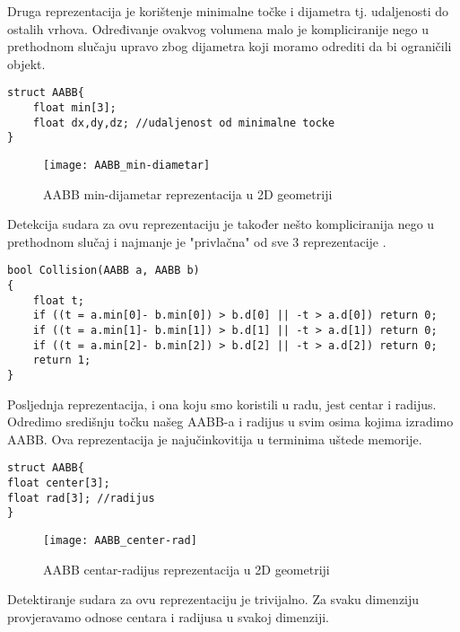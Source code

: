 Druga reprezentacija je korištenje minimalne točke i dijametra tj. udaljenosti do ostalih vrhova. Određivanje ovakvog volumena malo je kompliciranije nego u prethodnom slučaju upravo zbog dijametra koji moramo odrediti da bi ograničili objekt.

\begin{lstlisting}[style={myC++},label={code:3}, caption = {Struktura AABB-a koji koristi min točku i dijametar}]
struct AABB{
	float min[3];
	float dx,dy,dz; //udaljenost od minimalne tocke
}
\end{lstlisting}
 
 \begin{figure}[!http]
 	\begin{center}
 		\texttt{[image: AABB\_min-diametar]}
 		\caption{AABB min-dijametar reprezentacija u 2D geometriji}
 		\label{fig:4}
 	\end{center}
 \end{figure}


Detekcija sudara za ovu reprezentaciju je također nešto kompliciranija nego u prethodnom slučaj i najmanje je "privlačna" od sve 3 reprezentacije \cite{1}.


\begin{lstlisting}[style = {myC++},label={code:4}, caption = {Provjeravanje sudara za min-width reprezentaciju AABB-a\cite{1}}]
bool Collision(AABB a, AABB b)
{
	float t;
	if ((t = a.min[0]- b.min[0]) > b.d[0] || -t > a.d[0]) return 0;
	if ((t = a.min[1]- b.min[1]) > b.d[1] || -t > a.d[1]) return 0;
	if ((t = a.min[2]- b.min[2]) > b.d[2] || -t > a.d[2]) return 0;
	return 1;
}
\end{lstlisting}

Posljednja reprezentacija, i ona koju smo koristili u radu, jest centar i radijus. Odredimo središnju točku našeg AABB-a i radijus u svim osima kojima izradimo AABB. Ova reprezentacija je najučinkovitija u terminima uštede memorije\cite{1}. 

\begin{lstlisting}[style = {myC++},label={code:5}, caption = {Struktura AABB-a koji koristi centar i radijus}]
struct AABB{
float center[3];
float rad[3]; //radijus
}
\end{lstlisting}

 \begin{figure}[!http]
 	\begin{center}
 		\texttt{[image: AABB\_center-rad]}
 		\caption{AABB centar-radijus reprezentacija u 2D geometriji}
 		\label{fig:5}
 	\end{center}
 \end{figure}
 \newpage
 Detektiranje sudara za ovu reprezentaciju je trivijalno. Za svaku dimenziju provjeravamo odnose centara i radijusa u svakoj dimenziji.
 
